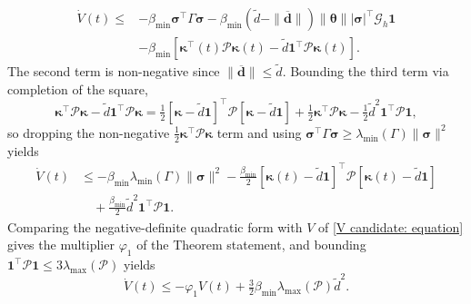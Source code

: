 \documentclass{IEEEtaes}
\begin{document}
\begin{align*}
\dot{V}(t)\le& -\beta_{\min}\boldsymbol{\sigma}^\top\Gamma\boldsymbol{\sigma} - \beta_{\min}(\tilde{d}-\|\boldsymbol{\overline{d}}\|)\|\boldsymbol{\theta}\||\boldsymbol{\sigma}|^\top\mathcal{G}_h\boldsymbol{1}\\
&- \beta_{\min}[\boldsymbol{\kappa}^\top(t)\mathcal{P}\boldsymbol{\kappa}(t) - \tilde{d}\boldsymbol{1}^\top\mathcal{P}\boldsymbol{\kappa}(t)].
\end{align*}
The second term is non-negative since $\|\boldsymbol{\overline{d}}\|\le\tilde{d}$. Bounding the third term via completion of the square,
\begin{equation*}
    \boldsymbol{\kappa}^\top\mathcal{P}\boldsymbol{\kappa} - \tilde{d}\boldsymbol{1}^\top\mathcal{P}\boldsymbol{\kappa} = \tfrac12[\boldsymbol{\kappa}-\tilde{d}\boldsymbol{1}]^\top\mathcal{P}[\boldsymbol{\kappa}-\tilde{d}\boldsymbol{1}] + \tfrac12\boldsymbol{\kappa}^\top\mathcal{P}\boldsymbol{\kappa} - \tfrac12\tilde{d}^2\boldsymbol{1}^\top\mathcal{P}\boldsymbol{1},
\end{equation*}
so dropping the non-negative $\tfrac12\boldsymbol{\kappa}^\top\mathcal{P}\boldsymbol{\kappa}$ term and using $\boldsymbol{\sigma}^\top\Gamma\boldsymbol{\sigma}\ge\lambda_{\min}(\Gamma)\|\boldsymbol{\sigma}\|^2$ yields
\begin{align*}
\dot{V}(t)&\le -\beta_{\min}\lambda_{\min}(\Gamma)\|\boldsymbol{\sigma}\|^2 - \tfrac{\beta_{\min}}{2}[\boldsymbol{\kappa}(t)-\tilde{d}\boldsymbol{1}]^\top\mathcal{P}[\boldsymbol{\kappa}(t)-\tilde{d}\boldsymbol{1}]\\
&\quad + \tfrac{\beta_{\min}}{2}\tilde{d}^2\boldsymbol{1}^\top\mathcal{P}\boldsymbol{1}.
\end{align*}
Comparing the negative-definite quadratic form with $V$ of \eqref{V candidate: equation} gives the multiplier $\varphi_1$ of the Theorem statement, and bounding $\boldsymbol{1}^\top\mathcal{P}\boldsymbol{1}\le 3\lambda_{\max}(\mathcal{P})$ yields
\begin{equation} \label{Vdot bound: equation}
    \dot{V}(t)\le -\varphi_1 V(t) + \tfrac32\beta_{\min}\lambda_{\max}(\mathcal{P})\tilde{d}^2.
\end{equation}
\end{document}
